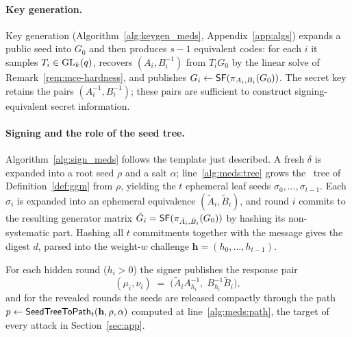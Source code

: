 \paragraph{Key generation.}
Key generation (Algorithm~\ref{alg:keygen_meds}, Appendix~\ref{app:algs})
expands a public seed into $G_0$ and then produces $s-1$ equivalent codes: for
each $i$ it samples $T_i \in \mathrm{GL}_k(q)$, recovers $(A_i,B_i^{-1})$ from
$T_i G_0$ by the linear solve of Remark~\ref{rem:mce-hardness}, and publishes
$G_i \leftarrow \mathsf{SF}(\pi_{A_i,B_i}(G_0))$. The secret key retains the pairs
$(A_i^{-1},B_i^{-1})$; these pairs are sufficient to construct signing-equivalent secret information.

\paragraph{Signing and the role of the seed tree.}
Algorithm~\ref{alg:sign_meds} follows the template just described. A fresh $\delta$ is expanded into a root seed
$\rho$ and a salt $\alpha$; line~\ref{alg:meds:tree} grows the \GGM\ tree of
Definition~\ref{def:ggm} from $\rho$, yielding the $t$ ephemeral leaf seeds
$\sigma_0,\ldots,\sigma_{t-1}$. Each $\sigma_i$ is expanded into an ephemeral
equivalence $(\tilde{A}_i, \tilde{B}_i)$, and round $i$ commits to the
resulting generator matrix
$\tilde{G}_i = \mathsf{SF}(\pi_{\tilde{A}_i,\tilde{B}_i}(G_0))$ by hashing its
non-systematic part. Hashing all $t$ commitments together with the message
gives the digest $d$, parsed into the weight-$w$ challenge
$\mathbf{h} = (h_0,\ldots,h_{t-1})$.

For each hidden round ($h_i > 0$) the signer publishes the response pair
\begin{equation}
  \label{eq:meds-resp}
  (\mu_i, \nu_i) \;=\; \bigl(\tilde{A}_i A_{h_i}^{-1},\;
                             B_{h_i}^{-1} \tilde{B}_i\bigr),
\end{equation}
and for the revealed rounds the seeds are released compactly through the path
$p \leftarrow \mathsf{SeedTreeToPath}_t(\mathbf{h},\rho,\alpha)$ computed at
line~\ref{alg:meds:path},
the target of every attack in Section~\ref{sec:app}.


